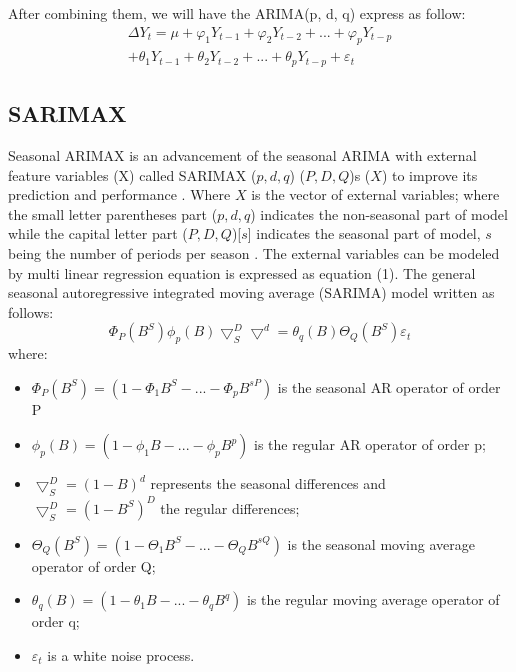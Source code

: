 \documentclass{ieeeojies}
\begin{document}
After combining them, we will have the ARIMA(p, d, q) express as follow:
\begin{equation}
    \begin{aligned}
        \Delta Y_t = \mu + \varphi_1Y_{t-1} + \varphi_2Y_{t-2} + ... +\varphi_pY_{t-p} \\
        + \theta_1Y_{t-1} + \theta_2Y_{t-2} + ... + \theta_pY_{t-p} + \varepsilon_t
    \end{aligned}
\end{equation}

\subsection{SARIMAX}
Seasonal ARIMAX is an advancement of the seasonal ARIMA with external feature variables (X) called SARIMAX ($p, d, q$) ($P,D,Q$)s ($X$) to improve its prediction and performance \cite{b9}. Where $X$ is the vector of external variables; where the small letter parentheses part ($p,d,q$) indicates the non-seasonal part of model while the capital letter part ($P,D,Q$)[$s$] indicates the seasonal part of model, $s$ being the number of periods per season \cite{b4}. The external variables can be modeled by multi linear regression equation is expressed as equation (1). The general seasonal autoregressive integrated moving average (SARIMA) model written as follows:
\begin{equation}
    \Phi_P(B^S)\phi_p(B)\bigtriangledown_S^D\bigtriangledown^d = \theta_q(B)\Theta_Q(B^S)\varepsilon_t
\end{equation}
where: 
\begin{itemize}
    \item $\Phi_P(B^S) = (1 - \Phi_1B^S - ... - \Phi_pB^{sP})$ is the seasonal AR operator of order P
    \item $\phi_p(B) = (1 - \phi_1B - ... - \phi_pB^p)$ is the regular AR operator of order p;
    \item $\bigtriangledown_S^D = (1 - B)^d$ represents the seasonal differences and $\bigtriangledown_S^D = (1 - B^S)^D$ the regular differences;
    \item $\Theta_Q(B^S) = (1 - \Theta_1B^S - ... - \Theta_QB^{sQ})$ is the seasonal moving average operator of order Q;
    \item $\theta_q(B) = (1 - \theta_1B - ... - \theta_qB^q) $ is the regular moving average operator of order q;
    \item $\varepsilon_t$ is a white noise process.
\end{itemize}
\end{document}
